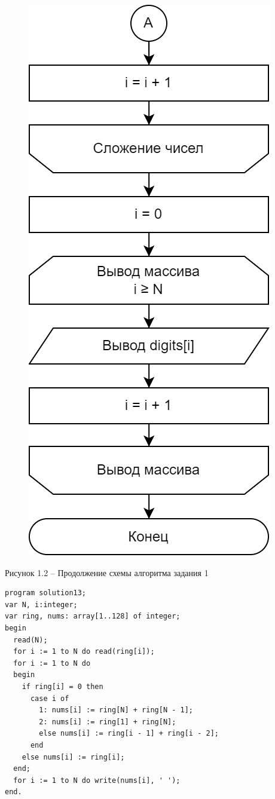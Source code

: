 \documentclass[a4paper,14pt]{extarticle}
\begin{document}
  \pagebreak
  \begin{figure}[h]
    \centering
    \includegraphics[width=0.25\linewidth]{schemes/s-1-2}
  \end{figure}
  \begin{center}
    Рисунок 1.2 – Продолжение схемы алгоритма задания 1
  \end{center}
  \begin{lstlisting}[tabsize=2,basicstyle=\ttfamily]
program solution13;
var N, i:integer;
var ring, nums: array[1..128] of integer;
begin
  read(N);
  for i := 1 to N do read(ring[i]);
  for i := 1 to N do
  begin
    if ring[i] = 0 then
      case i of
        1: nums[i] := ring[N] + ring[N - 1];
        2: nums[i] := ring[1] + ring[N];
        else nums[i] := ring[i - 1] + ring[i - 2];
      end
    else nums[i] := ring[i];
  end;
  for i := 1 to N do write(nums[i], ' ');
end.
  \end{lstlisting}

  \newpage
\end{document}

